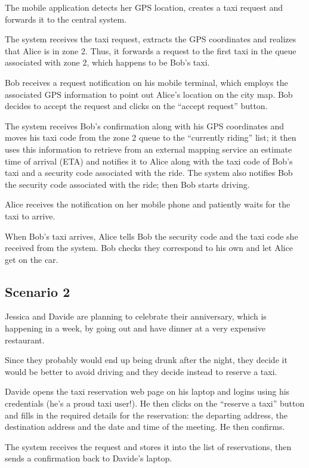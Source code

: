 The mobile application detects her GPS location, creates a taxi request and forwards it to the central system.

The system receives the taxi request, extracts the GPS coordinates and realizes that Alice is in zone 2. Thus, it forwards a request to the first taxi in the queue associated with zone 2, which happens to be Bob’s taxi.

Bob receives a request notification on his mobile terminal, which employs the associated GPS information to point out Alice’s location on the city map. Bob decides to accept the request and clicks on the “accept request” button.

The system receives Bob’s confirmation along with his GPS coordinates and moves his taxi code from the zone 2 queue to the “currently riding” list; it then uses this information to retrieve from an external mapping service an estimate time of arrival (ETA) and notifies it to Alice along with the taxi code of Bob’s taxi and a security code associated with the ride. The system also notifies Bob the security code associated with the ride; then Bob starts driving.

Alice receives the notification on her mobile phone and patiently waits for the taxi to arrive.

When Bob’s taxi arrives, Alice tells Bob the security code and the taxi code she received from the system. Bob checks they correspond to his own and let Alice get on the car.


\subsection{Scenario 2}
Jessica and Davide are planning to celebrate their anniversary, which is happening in a week, by going out and have dinner at a very expensive restaurant.

Since they probably would end up being drunk after the night, they decide it would be better to avoid driving and they decide instead to reserve a taxi.

Davide opens the taxi reservation web page on his laptop and logins using his credentials (he’s a proud taxi user!). He then clicks on the “reserve a taxi” button and fills in the required details for the reservation: the departing address, the destination address and the date and time of the meeting. He then confirms.

The system receives the request and stores it into the list of reservations, then sends a confirmation back to Davide’s laptop.

